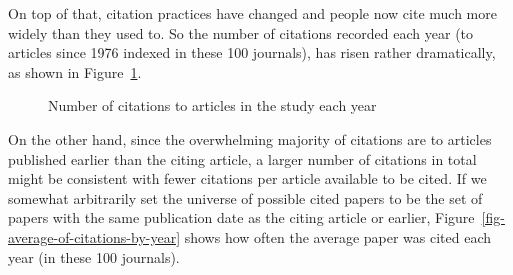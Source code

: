 \documentclass[
  10pt,
  letterpaper,
  DIV=11,
  numbers=noendperiod,
  twoside]{scrartcl}
\begin{document}
On top of that, citation practices have changed and people now cite much
more widely than they used to. So the number of citations recorded each
year (to articles since 1976 indexed in these 100 journals), has risen
rather dramatically, as shown in
Figure~\ref{fig-number-of-citations-by-year}.

\begin{figure}


\caption{\label{fig-number-of-citations-by-year}Number of citations to
articles in the study each year}

\end{figure}%

On the other hand, since the overwhelming majority of citations are to
articles published earlier than the citing article, a larger number of
citations in total might be consistent with fewer citations per article
available to be cited. If we somewhat arbitrarily set the universe of
possible cited papers to be the set of papers with the same publication
date as the citing article or earlier,
Figure~\ref{fig-average-of-citations-by-year} shows how often the
average paper was cited each year (in these 100 journals).
\end{document}
